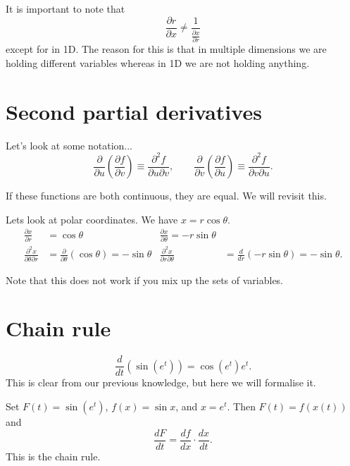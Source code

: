 \begin{remark}
    It is important to note that \[ \frac{\partial r}{\partial x} \neq \frac{1}{ \frac{\partial x}{\partial r} } \] except for in 1D. The reason for this is that in multiple dimensions we are holding different variables whereas in 1D we are not holding anything.
\end{remark}

\section{Second partial derivatives}

Let's look at some notation... \[ \frac{\partial}{\partial u} \left( \frac{\partial f}{\partial v} \right) \equiv \frac{\partial^2 f}{\partial u \partial v}, \qquad \frac{\partial}{\partial v} \left( \frac{\partial f}{\partial u} \right) \equiv \frac{\partial^2 f}{\partial v \partial u}. \]

If these functions are both continuous, they are equal. We will revisit this. 

\begin{example}
    Lets look at polar coordinates. We have $x = r \cos{\theta}$.
    \begin{align*}
        \frac{\partial x}{\partial r} &= \cos{\theta} & \frac{\partial x}{\partial \theta} = -r\sin{\theta} \\
        \frac{\partial^2 x}{\partial \theta \partial r} &= \frac{\partial}{\partial \theta} \left( \cos{\theta} \right) = -\sin{\theta} & \frac{\partial^2 x}{\partial r \partial \theta} &= \frac{d}{dr} \left( -r\sin{\theta} \right) = -\sin{\theta}.
    \end{align*}
\end{example}

\begin{remark}
    Note that this does not work if you mix up the sets of variables.
\end{remark}

\section{Chain rule} 

\begin{example}
    \[ \frac{d}{dt} \left( \sin{(e^t)} \right) = \cos{(e^t)} e^t. \] This is clear from our previous knowledge, but here we will formalise it.
\end{example}

Set $F(t) = \sin{(e^t)}$, $f(x) = \sin{x}$, and $x = e^t$. Then $F(t) = f(x(t))$ and \[ \frac{dF}{dt} = \frac{df}{dx} \cdot \frac{dx}{dt}. \] This is the chain rule.

